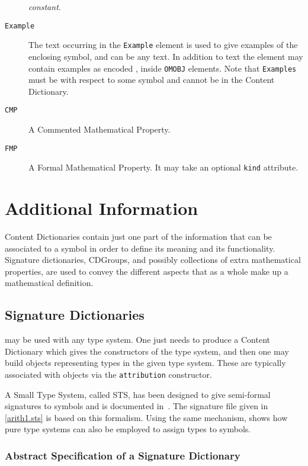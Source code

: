 \begin{description}
  \emph{constant}.
\item[\lstinline|Example|] The text occurring in the \lstinline|Example| element is used
  to give examples of the enclosing symbol, and can be any \XML text. In addition to text
  the element may contain examples as \XML encoded \OM, inside \lstinline|OMOBJ|
  elements.  Note that \lstinline|Examples| must be with respect to some symbol and
  cannot be  in the Content Dictionary.
\item[\lstinline|CMP|] A Commented Mathematical Property.
\item[\lstinline|FMP|] A Formal Mathematical Property.  It may take an optional
  \lstinline|kind| attribute.
\end{description}

\section{Additional Information}\label{addfiles}

Content Dictionaries contain just one part of the information that can be associated to a
symbol in order to define its meaning and its functionality. \OM Signature dictionaries,
CDGroups, and possibly collections of extra mathematical properties, are used to convey
the different aspects that as a whole make up a mathematical definition.

\subsection{Signature Dictionaries}\label{sigfiles}

\OM may be used with any type system. One just needs to produce a Content Dictionary which
gives the constructors of the type system, and then one may build \OM objects representing
types in the given type system. These are typically associated with \OM objects via the
\OM \lstinline|attribution| constructor.

A Small Type System, called STS, has been designed to give semi-formal signatures to \OM
symbols and is documented in~\cite{OM_D132c}.  The signature file given in
\ref{arith1.sts} is based on this formalism. Using the same mechanism, \cite{OMD132b}
shows how pure type systems can also be employed to assign types to \OM symbols.

\subsubsection{Abstract Specification  of a Signature Dictionary}\label{sect_sigpcdata}

